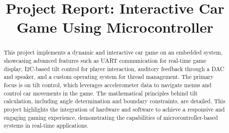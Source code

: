\documentclass[conference]{IEEEtran}
\begin{document}
\title{Project Report: Interactive Car Game Using Microcontroller\\}

\author{
\centering
{}
\vspace{1em}
\and
{}
\vspace{1em}
}
\maketitle

\begin{abstract}
This project implements a dynamic and interactive car game on an embedded system, showcasing advanced features such as UART communication for real-time game display, I2C-based tilt control for player interaction, auditory feedback through a DAC and speaker, and a custom operating system for thread management. The primary focus is on tilt control, which leverages accelerometer data to navigate menus and control car movements in the game. The mathematical principles behind tilt calculation, including angle determination and boundary constraints, are detailed. This project highlights the integration of hardware and software to achieve a responsive and engaging gaming experience, demonstrating the capabilities of microcontroller-based systems in real-time applications.
\end{abstract}
\end{document}
